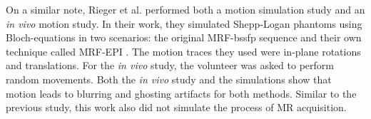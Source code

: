\hfill

On a similar note, Rieger et al. \cite{Rieger2017} performed both a motion simulation study and an \textit{in vivo} motion study.
In their work, they simulated Shepp-Logan phantoms using Bloch-equations in two scenarios: the original MRF-\ac{bssfp} sequence \cite{Ma2013} and their own technique called MRF-EPI \cite{Rieger2016}. 
The motion traces they used were in-plane rotations and translations.
For the \textit{in vivo} study, the volunteer was asked to perform random movements.
Both the \textit{in vivo} study and the simulations show that motion leads to blurring and ghosting artifacts for both methods.
Similar to the previous study, this work also did not simulate the process of MR acquisition.

